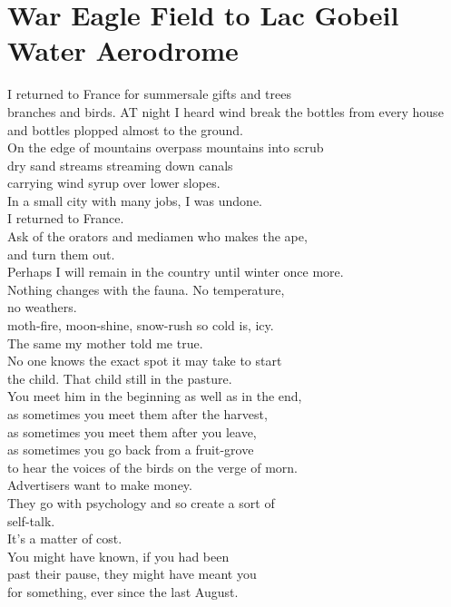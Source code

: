 \documentclass[smalldemyvopaper,11pt,twoside,onecolumn,openright,extrafontsizes]{memoir}
\begin{document}
\chapter{War Eagle Field to Lac Gobeil Water Aerodrome}
I returned to France for summersale gifts and trees
\\branches and birds. AT night I heard wind break the bottles from every house
\\and bottles plopped almost to the ground.
\\On the edge of mountains overpass mountains into scrub
\\dry sand streams streaming down canals
\\carrying wind syrup over lower slopes.
\\In a small city with many jobs, I was undone.
\\I returned to France.
\\Ask of the orators and mediamen who makes the ape,
\\and turn them out.
\\Perhaps I will remain in the country until winter once more.
\\Nothing changes with the fauna. No temperature,
\\no weathers.
\\moth-fire, moon-shine, snow-rush so cold is, icy.
\\The same my mother told me true.
\\No one knows the exact spot it may take to start
\\the child. That child still in the pasture.
\\You meet him in the beginning as well as in the end,
\\as sometimes you meet them after the harvest,
\\as sometimes you meet them after you leave,
\\as sometimes you go back from a fruit-grove
\\to hear the voices of the birds on the verge of morn.
\\Advertisers want to make money.
\\They go with psychology and so create a sort of
\\self-talk.
\\It's a matter of cost.
\\You might have known, if you had been
\\past their pause, they might have meant you
\\for something, ever since the last August.
\end{document}
